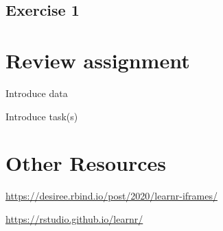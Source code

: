 \documentclass[
]{book}
\begin{document}
\hypertarget{exercise-1-8}{%
\subsection*{Exercise 1}\label{exercise-1-8}}

\hypertarget{review-assignment-12}{%
\section*{Review assignment}\label{review-assignment-12}}

Introduce data

Introduce task(s)

\hypertarget{other-resources-10}{%
\section*{Other Resources}\label{other-resources-10}}

\url{https://desiree.rbind.io/post/2020/learnr-iframes/}

\url{https://rstudio.github.io/learnr/}

  
\end{document}
